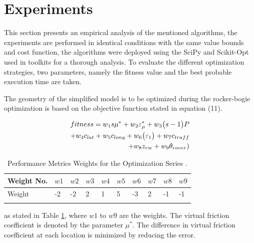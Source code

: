 \documentclass[default,iicol]{sn-jnl}
\theoremstyle{thmstyleone}
\theoremstyle{thmstyletwo}
\theoremstyle{thmstylethree}
\begin{document}

\section{Experiments}\label{sec4}

This section presents an empirical analysis of the mentioned algorithms, the experiments are performed in identical conditions with the same value bounds and cost function, the algorithms were deployed using the SciPy \cite{bib27} and Scikit-Opt used in \cite{bib30} toolkits for a thorough analysis. To evaluate the different optimization strategies, two parameters, namely the fitness value and the best probable execution time are taken.

The geometry of the simplified model is to be optimized during the rocker-bogie optimization is based on the objective function stated in equation (11). 

\begin{equation}
\begin{split}
fitness = w _{1} s \mu^{\ast}  +  w  _{2} 
   \varepsilon _{ \mu } ^{\ast} +   w  _{3}  \big(s-1\big) 
     P \cr + w _{4}c _{lat}  + w _{5} c _{long}    +  w _{6}  
       \big( \varepsilon  _{1}   \big)  + w _{7}c _{traff}   
         \cr + w _{8}z _{rw}  +  w _{9} \theta  _{rover}) 
\end{split}
\end{equation}

\begin{table}[ht]
\begin{center}
\begin{minipage}{174pt}
\caption{ Performance Metrics Weights for the Optimization Series \cite{bib1}. }\label{tab2}
\begin{tabular}{@{}llllllllll@{}}
\toprule
Weight No. & $w1$  & $w2$ & $w3$ &$w4$ & $w5$ & $w6$ &$w7$ &$w8$ &$w9$ \\
\midrule
Weight   & -2  &  -2  & 2 & 1 & 5 & -3 & 2 & -1 & -1\\
\botrule
\end{tabular}
\end{minipage}
\end{center}
\end{table}

as stated in Table \ref{tab2}, where $w1$ to $w9$ are the weights. The virtual friction coefficient is denoted by the parameter $\mu^{ \ast }$. The difference in virtual friction coefficient at each location is minimized by reducing the error. 
\end{document}
